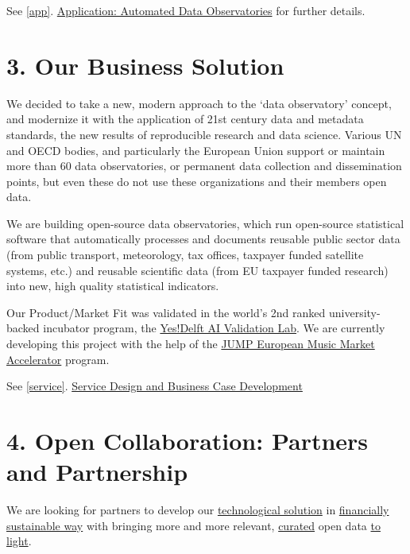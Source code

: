 \documentclass[
  a4paper,
  openany, a4paper, oneside]{book}
\begin{document}
See \ref{app}. \protect\hyperlink{app}{Application: Automated Data Observatories} for further details.

\hypertarget{business-solution}{%
\section*{3. Our Business Solution}\label{business-solution}}

We decided to take a new, modern approach to the `data observatory' concept, and modernize it with the application of 21st century data and metadata standards, the new results of reproducible research and data science. Various UN and OECD bodies, and particularly the European Union support or maintain more than 60 data observatories, or permanent data collection and dissemination points, but even these do not use these organizations and their members open data.

We are building open-source data observatories, which run open-source statistical software that automatically processes and documents reusable public sector data (from public transport, meteorology, tax offices, taxpayer funded satellite systems, etc.) and reusable scientific data (from EU taxpayer funded research) into new, high quality statistical indicators.

Our Product/Market Fit was validated in the world's 2nd ranked university-backed incubator program, the \href{https://music.dataobservatory.eu/post/2020-09-25-yesdelft-validation/}{Yes!Delft AI Validation Lab}. We are currently developing this project with the help of the \href{https://www.jumpmusic.eu/fellow2021/automated-music-observatory/}{JUMP European Music Market Accelerator} program.

See \ref{service}. \protect\hyperlink{service}{Service Design and Business Case Development}

\hypertarget{open-for-partners}{%
\section*{4. Open Collaboration: Partners and Partnership}\label{open-for-partners}}

We are looking for partners to develop our \protect\hyperlink{app}{technological solution} in \href{service}{financially sustainable way} with bringing more and more relevant, \protect\hyperlink{data-curators}{curated} open data \protect\hyperlink{open-data}{to light}.
\end{document}
